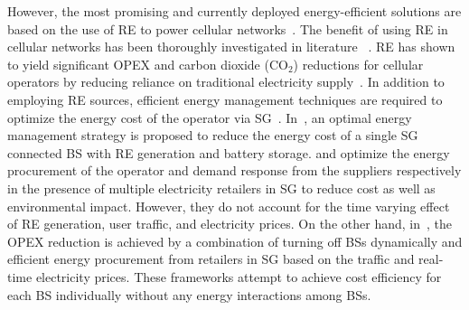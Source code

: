 \documentclass[10pt, letter,twocolumn]{IEEEtran}
\begin{document}
{However, the most promising and currently deployed energy-efficient solutions are based on the use of RE to power cellular networks~\cite{solar_powered_BS,solar_installation,suggested3}. The benefit of using RE in cellular networks has been thoroughly investigated in literature ~\cite{bhargava,energy_management1,procurement,smart_grid_cellular,sharing1}. RE has shown to yield significant OPEX and carbon dioxide (CO$_2$) reductions for cellular operators by reducing reliance on traditional electricity supply~\cite{bhargava}.} In addition to employing RE sources, efficient energy management techniques are required to optimize the energy cost of the operator via SG~\cite{energy_management1,procurement,drm_junaid,smart_grid_cellular}. In~\cite{energy_management1}, an optimal energy management strategy is proposed to reduce the energy cost of a single SG connected BS with RE generation and battery storage. \cite{procurement} and \cite{drm_junaid} optimize the energy procurement of the operator and demand response from the suppliers respectively in the presence of multiple electricity retailers in SG to reduce cost as well as environmental impact. However, they do not account for the time varying effect of RE generation, user traffic, and electricity prices. On the other hand, in~\cite{smart_grid_cellular}, the OPEX reduction is achieved by a combination of turning off BSs dynamically and efficient energy procurement from retailers in SG based on the traffic and real-time electricity prices. These frameworks attempt to achieve cost efficiency for each BS individually without any energy interactions among BSs.
\end{document}
